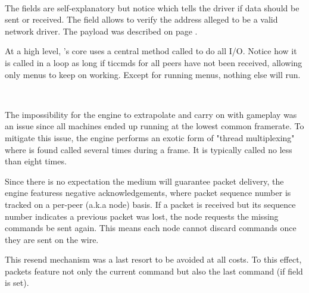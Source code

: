  \label{doomcom_t.c} \\
\par
\vspace{-10pt}
The fields are self-explanatory but notice  which tells the driver if data should be sent or received. The  field allows \doom{} to verify the address alleged to be a valid network driver. The  payload was described on page \pageref{cmd_t_type}.



At a high level, \doom{}'s core uses a central method called  to do all I/O. Notice how it is called in a loop as long if ticcmds for all peers have not been received, allowing only menus to keep on working. Except for running menus, nothing else will run.\\
\par
{}\\
\par
The impossibility for the engine to extrapolate and carry on with gameplay was an issue since all machines ended up running at the lowest common framerate. To mitigate this issue, the engine performs an exotic form of "thread multiplexing" where  is found called several times during a frame. It is typically called no less than eight times.\\
\par
{}



Since there is no expectation the medium will guarantee packet delivery, the engine featuress negative acknowledgements, where packet sequence number is tracked on a per-peer (a.k.a node) basis. If a packet is received but its sequence number indicates a previous packet was lost, the node requests the missing commands be sent again. This means each node cannot discard commands once they are sent on the wire.\\
\par
This resend mechanism was a last resort to be avoided at all costs. To this effect, packets feature not only the current command but also the last command (if field  is set).\\




\vspace{-15pt}
